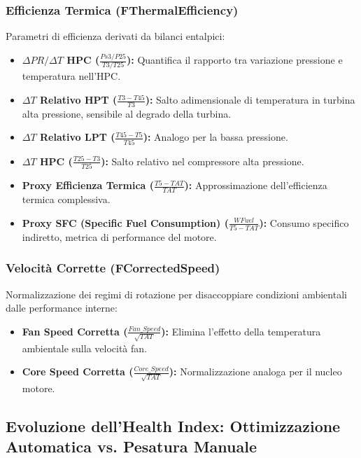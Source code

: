 \subsubsection{Efficienza Termica (FThermalEfficiency)}

Parametri di efficienza derivati da bilanci entalpici:
\begin{itemize}
    \item \textbf{$\Delta PR/\Delta T$ HPC ($\frac{Ps3/P25}{T3/T25}$):} Quantifica il rapporto tra variazione pressione e temperatura nell'HPC.
    \item \textbf{$\Delta T$ Relativo HPT ($\frac{T3 - T45}{T3}$):} Salto adimensionale di temperatura in turbina alta pressione, sensibile al degrado della turbina.
    \item \textbf{$\Delta T$ Relativo LPT ($\frac{T45 - T5}{T45}$):} Analogo per la bassa pressione.
    \item \textbf{$\Delta T$ HPC ($\frac{T25-T3}{T25}$):} Salto relativo nel compressore alta pressione.
    \item \textbf{Proxy Efficienza Termica ($\frac{T5 - TAT}{TAT}$):} Approssimazione dell'efficienza termica complessiva.
    \item \textbf{Proxy SFC (Specific Fuel Consumption) ($\frac{WFuel}{T5 - TAT}$):} Consumo specifico indiretto, metrica di performance del motore.
\end{itemize}

\subsubsection{Velocità Corrette (FCorrectedSpeed)}

Normalizzazione dei regimi di rotazione per disaccoppiare condizioni ambientali dalle performance interne:
\begin{itemize}
    \item \textbf{Fan Speed Corretta ($\frac{Fan\_Speed}{\sqrt{TAT}}$):} Elimina l'effetto della temperatura ambientale sulla velocità fan.
    \item \textbf{Core Speed Corretta ($\frac{Core\_Speed}{\sqrt{TAT}}$):} Normalizzazione analoga per il nucleo motore.
\end{itemize}

\subsection{Evoluzione dell'Health Index: Ottimizzazione Automatica vs. Pesatura Manuale}

